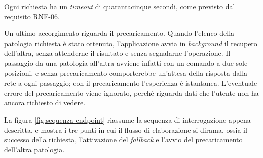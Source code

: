 Ogni richiesta ha un \textit{timeout} di quarantacinque secondi, come previsto dal requisito RNF-06.

Un ultimo accorgimento riguarda il precaricamento.
Quando l'elenco della patologia richiesta è stato ottenuto, l'applicazione avvia in \textit{background} il recupero dell'altra, senza
attenderne il risultato e senza segnalarne l'operazione.
Il passaggio da una patologia all'altra avviene infatti con un comando a due sole posizioni, e senza
precaricamento comporterebbe un'attesa della risposta dalla rete a ogni passaggio; con il precaricamento l'esperienza è istantanea. %
L'eventuale errore del precaricamento viene ignorato, perché riguarda dati che l'utente non ha ancora richiesto di vedere.

La figura \ref{fig:sequenza-endpoint} riassume la sequenza di interrogazione appena descritta, e mostra i tre punti
in cui il flusso di elaborazione si dirama, ossia il successo della richiesta, l'attivazione del \textit{fallback} e l'avvio del
precaricamento dell'altra patologia.

